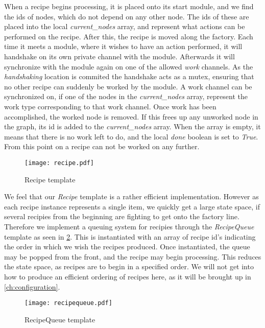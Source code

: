 When a recipe begins processing, it is placed onto its start module, and we find the ids of nodes, which do not depend on any other node. The ids of these are placed into the local \emph{current\_nodes} array, and represent what actions can be performed on the recipe. After this, the recipe is moved along the factory. Each time it meets a module, where it wishes to have an action performed, it will handshake on its own private channel with the module. Afterwards it will synchronize with the module again on one of the allowed \emph{work} channels. As the \emph{handshaking} location is commited the handshake acts as a mutex, ensuring that no other recipe can suddenly be worked by the module. A work channel can be synchronized on, if one of the nodes in the \emph{current\_nodes} array, represent the work type corresponding to that work channel. Once work has been accomplished, the worked node is removed. If this frees up any unworked node in the graph, its id is added to the \emph{current\_nodes} array. When the array is empty, it means that there is no work left to do, and the local \emph{done} boolean is set to \emph{True}. From this point on a recipe can not be worked on any further.


\begin{figure}[h]
\centering
\texttt{[image: recipe.pdf]}
\caption{Recipe template}
\label{fig:recipe}
\end{figure}

We feel that our \emph{Recipe} template is a rather efficient implementation. However as each recipe instance represents a single item, we quickly get a large state space, if several recipies from the beginning are fighting to get onto the factory line. Therefore we implement a queuing system for recipies through the \emph{RecipeQueue} template as seen in \cref{fig:recipequeue}. This is instantiated with an array of recipe id's indicating the order in which we wish the recipes produced. Once instantiated, the queue may be popped from the front, and the recipe may begin processing. This reduces the state space, as recipes are to begin in a specified order. We will not get into how to produce an efficient ordering of recipes here, as it will be brought up in \cref{ch:configuration}.

\begin{figure}[h]
\centering
\texttt{[image: recipequeue.pdf]}
\caption{RecipeQueue template}
\label{fig:recipequeue}
\end{figure}